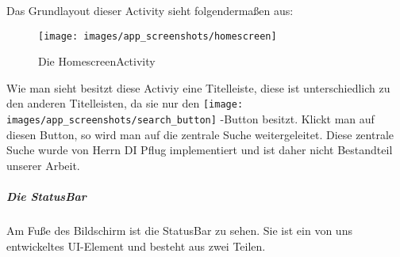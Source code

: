 Das Grundlayout dieser Activity sieht folgendermaßen aus:
\begin{figure}[H]
\centering
\texttt{[image: images/app\_screenshots/homescreen]}
\caption{Die HomescreenActivity}
\end{figure} 

Wie man sieht besitzt diese Activiy eine Titelleiste, diese ist unterschiedlich zu den anderen Titelleisten, da sie nur den \texttt{[image: images/app\_screenshots/search\_button]} -Button besitzt. Klickt man auf diesen Button, so wird man auf die zentrale Suche weitergeleitet. Diese zentrale Suche wurde von Herrn DI Pflug implementiert und ist daher nicht Bestandteil unserer Arbeit.

\subparagraph{Die StatusBar}

Am Fuße des Bildschirm ist die StatusBar zu sehen. Sie ist ein von uns entwickeltes UI-Element und besteht aus zwei Teilen.

